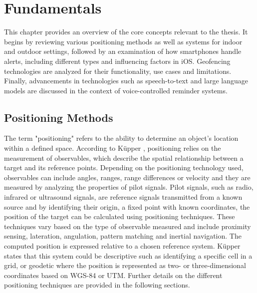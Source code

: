 \chapter{Fundamentals}
\label{cha:Fundamentals}

This chapter provides an overview of the core concepts relevant to the thesis. It begins by reviewing various positioning methods as well as systems for indoor and outdoor settings, followed by an examination of how smartphones handle alerts, including different types and influencing factors in iOS. Geofencing technologies are analyzed for their functionality, use cases and limitations. Finally, advancements in technologies such as speech-to-text and large language models are discussed in the context of voice-controlled reminder systems.

\section{Positioning Methods}
\label{sec:methods}
The term "positioning" refers to the ability to determine an object's location within a defined space. According to K\"upper \cite{kupper2005location}, positioning relies on the measurement of observables, which describe the spatial relationship between a target and its reference points. 
Depending on the positioning technology used, observables can include angles, ranges, range differences or velocity and they are measured by analyzing the properties of pilot signals. 
Pilot signals, such as radio, infrared or ultrasound signals, are reference signals transmitted from a known source and by identifying their origin, a fixed point with known coordinates, the position of the target can be calculated using positioning techniques. 
These techniques vary based on the type of observable measured and include proximity sensing, lateration, angulation, pattern matching and inertial navigation.
The computed position is expressed relative to a chosen reference system. K\"upper \cite{kupper2005location} states that this system could be descriptive such as identifying a specific cell in a grid, or geodetic where the position is represented as two- or three-dimensional coordinates based on WGS-84 or UTM. 
Further details on the different positioning techniques are provided in the following sections.

